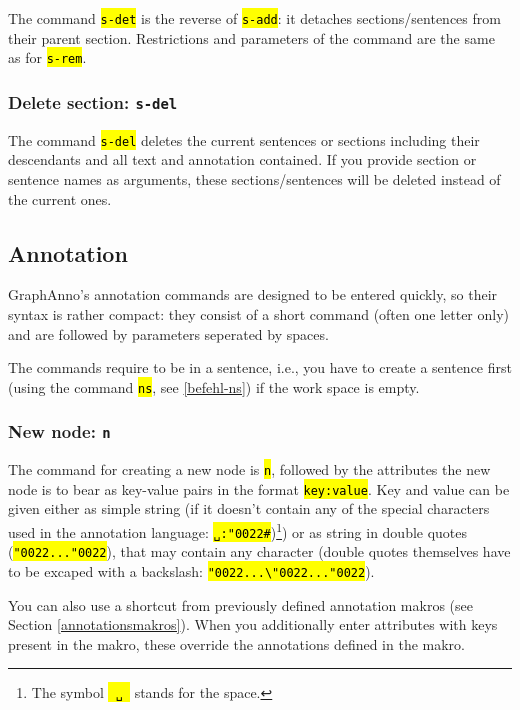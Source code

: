 \documentclass[12pt]{scrartcl}
\newcommand{\quo}{\char"0022}
\newcommand{\code}[1]{\hl{\texttt{#1}}}
\begin{document}
The command \code{s-det} is the reverse of \code{s-add}: it detaches sections/sentences from their parent section.
Restrictions and parameters of the command are the same as for \code{s-rem}.

\subsubsection{Delete section: \texttt{s-del}}

The command \code{s-del} deletes the current sentences or sections including their descendants and all text and annotation contained.
If you provide section or sentence names as arguments, these sections/sentences will be deleted instead of the current ones.


\subsection{Annotation}\label{annotationsbefehle}

GraphAnno’s annotation commands are designed to be entered quickly, so their syntax is rather compact:
they consist of a short command (often one letter only) and are followed by parameters seperated by spaces.

The commands require to be in a sentence, i.e., you have to create a sentence first (using the command \code{ns}, see \ref{befehl-ns}) if the work space is empty.


\subsubsection{New node: \texttt{n}}\label{befehl-n}

The command for creating a new node is \code{n}, followed by the attributes the new node is to bear as key-value pairs in the format \code{key:value}.
Key and value can be given either as simple string (if it doesn’t contain any of the special characters used in the annotation language: \code{␣:\quo\#})\footnote{The symbol \code{\mbox{\,␣\,}} stands for the space.}) or as string in double quotes (\code{\quo...\quo}), that may contain any character (double quotes themselves have to be excaped with a backslash: \code{\quo...\textbackslash\quo...\quo}).

You can also use a shortcut from previously defined annotation makros (see Section \ref{annotationsmakros}).
When you additionally enter attributes with keys present in the makro, these override the annotations defined in the makro.
\end{document}
